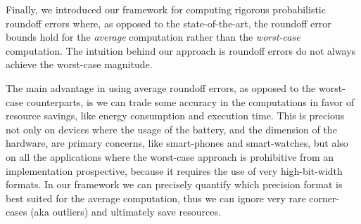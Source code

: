 Finally, we introduced our framework for computing rigorous probabilistic roundoff errors where, as opposed to the state-of-the-art, the roundoff error bounds hold for the \emph{average} computation rather than the \emph{worst-case} computation.
%
The intuition behind our approach is roundoff errors do not always achieve the worst-case magnitude. 
%

The main advantage in using average roundoff errors, as opposed to the worst-case counterparts, is we can trade some accuracy in the computations in favor of resource savings, like energy consumption and execution time.
%
This is precious not only on devices where the usage of the battery, and the dimension of the hardware, are primary concerns, like smart-phones and smart-watches, but also on all the applications where the worst-case approach is prohibitive from an implementation prospective, because it requires the use of very high-bit-width formats. 
%
In our framework we can precisely quantify which precision format is best suited for the average computation, thus we can ignore very rare corner-cases (aka outliers) and ultimately save resources.
%